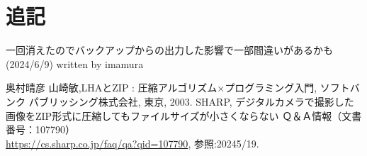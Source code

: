 \documentclass[documentclass]{jsarticle}
\begin{document}
\newpage
\section*{追記}
一回消えたのでバックアップからの出力した影響で一部間違いがあるかも(2024/6/9)
written by imamura

\newpage
\begin{thebibliography}{9}
   奥村晴彦 山崎敏,LHAとZIP : 圧縮アルゴリズム×プログラミング入門, ソフトバンク パブリッシング株式会社, 東京, 2003.
   SHARP, デジタルカメラで撮影した画像をZIP形式に圧縮してもファイルサイズが小さくならない Ｑ＆Ａ情報（文書番号：107790）\\
  \url{https://cs.sharp.co.jp/faq/qa?qid=107790}, 参照:20245/19.
\end{thebibliography}
\end{document}
